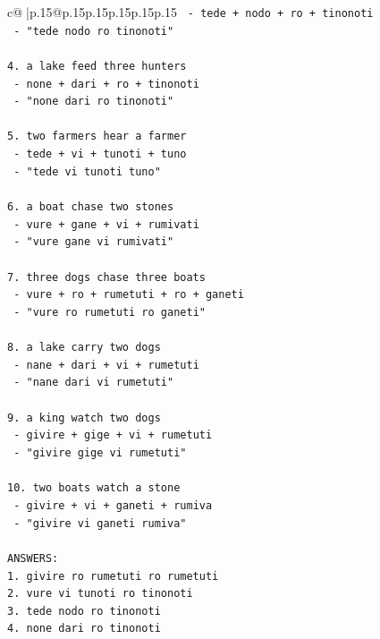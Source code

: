 \documentclass{article}
\begin{document}
{\begin{supertabular}{c@{$\;$}|p{.15\linewidth}@{}p{.15\linewidth}p{.15\linewidth}p{.15\linewidth}p{.15\linewidth}p{.15\linewidth}}
{{{\texttt{   {-} tede + nodo + ro + tinonoti} \\
\texttt{   {-} "tede nodo ro tinonoti"} \\
\\ 
\texttt{4. a lake feed three hunters} \\
\texttt{   {-} none + dari + ro + tinonoti} \\
\texttt{   {-} "none dari ro tinonoti"} \\
\\ 
\texttt{5. two farmers hear a farmer} \\
\texttt{   {-} tede + vi + tunoti + tuno} \\
\texttt{   {-} "tede vi tunoti tuno"} \\
\\ 
\texttt{6. a boat chase two stones} \\
\texttt{   {-} vure + gane + vi + rumivati} \\
\texttt{   {-} "vure gane vi rumivati"} \\
\\ 
\texttt{7. three dogs chase three boats} \\
\texttt{   {-} vure + ro + rumetuti + ro + ganeti} \\
\texttt{   {-} "vure ro rumetuti ro ganeti"} \\
\\ 
\texttt{8. a lake carry two dogs} \\
\texttt{   {-} nane + dari + vi + rumetuti} \\
\texttt{   {-} "nane dari vi rumetuti"} \\
\\ 
\texttt{9. a king watch two dogs} \\
\texttt{   {-} givire + gige + vi + rumetuti} \\
\texttt{   {-} "givire gige vi rumetuti"} \\
\\ 
\texttt{10. two boats watch a stone} \\
\texttt{    {-} givire + vi + ganeti + rumiva} \\
\texttt{    {-} "givire vi ganeti rumiva"} \\
\\ 
\texttt{ANSWERS:} \\
\texttt{1. givire ro rumetuti ro rumetuti} \\
\texttt{2. vure vi tunoti ro tinonoti} \\
\texttt{3. tede nodo ro tinonoti} \\
\texttt{4. none dari ro tinonoti} \\
}}}
\end{supertabular}}
\end{document}

